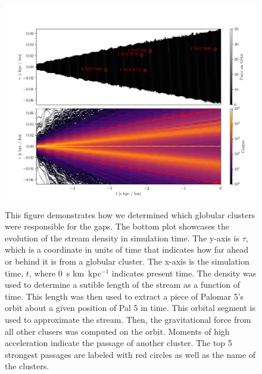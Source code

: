\documentclass[]{aa}
\begin{document}
  \begin{figure}
    \centering
    \includegraphics[width=\linewidth]{force_on_orbit-monte-carlo-009.png}
    \caption[]{This figure demonstrates how we determined which globular clusters were responsible for the gaps. The bottom plot showcases the evolution of the stream density in simulation time. The y-axis is $\tau$, which is a coordinate in units of time that indicates how far ahead or behind it is from a globular cluster. The x-axis is the simulation time, $t$, where 0~s km~kpc$^{-1}$ indicates present time. The density was used to determine a sutible length of the stream as a function of time. This length was then used to extract a piece of Palomar 5's orbit about a given position of Pal 5 in time. This orbital segment is used to approximate the stream. Then, the gravitational force from all other clusers was computed on the orbit. Moments of high acceleration indicate the passage of another cluster. The top 5 strongest passages are labeled with red circles as well as the name of the clusters. }
    \label{fig:profiles}
    \end{figure}  
\end{document}
